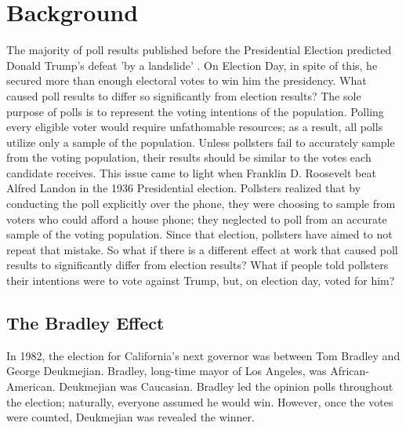 
\section{Background}

The majority of poll results published before the Presidential Election
predicted Donald Trump's defeat 'by a landslide' \citep{pomarico_nate_2016}.
On Election Day, in spite of this, he secured more than enough electoral votes
to win him the presidency. What caused poll results to differ so significantly
from election results? The sole purpose of polls is to represent the voting
intentions of the population. Polling every eligible voter would require
unfathomable resources; as a result, all polls utilize only a sample of the
population. Unless pollsters fail to accurately sample from the voting
population, their results should be similar to the votes each candidate
receives. This issue came to light when Franklin D. Roosevelt beat Alfred
Landon in the 1936 Presidential election. Pollsters realized that by
conducting the poll explicitly over the phone, they were choosing to sample
from voters who could afford a house phone; they neglected to poll from an
accurate sample of the voting population. Since that election, pollsters have
aimed to not repeat that mistake. So what if there is a different effect at
work that caused poll results to significantly differ from election results?
What if people told pollsters their intentions were to vote against Trump,
but, on election day, voted for him?

\subsection{The Bradley Effect}


In 1982, the election for California's next governor was between Tom Bradley
and George Deukmejian. Bradley, long-time mayor of Los Angeles, was
African-American. Deukmejian was Caucasian. Bradley led the opinion polls
throughout the election; naturally, everyone assumed he would win. However,
once the votes were counted, Deukmejian was revealed the winner.

